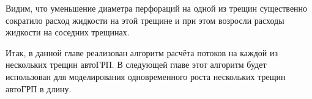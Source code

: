 Видим, что уменьшение диаметра перфораций на одной из трещин существенно сократило расход жидкости на этой трещине и при этом возросли расходы жидкости на соседних трещинах.

Итак, в данной главе реализован алгоритм расчёта потоков на каждой из нескольких трещин автоГРП.
В следующей главе этот алгоритм будет использован для моделирования одновременного роста нескольких трещин автоГРП в длину.
